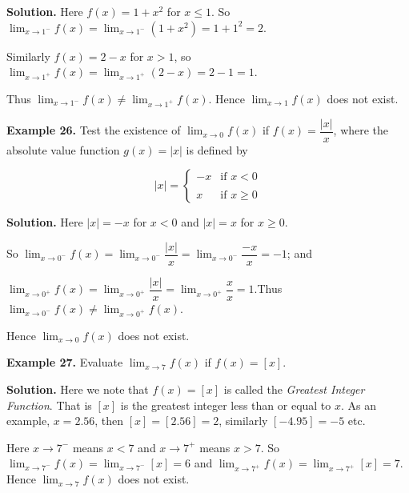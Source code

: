 \documentclass[../../main.tex]{subfiles}
\begin{document}
\textbf{Solution.} Here $f(x) = 1+x^2$ for $x\leq 1$. So $\lim_{x\rightarrow 1^-}f(x) = \lim_{x\rightarrow 1^-}(1+x^2) = 1+1^2 = 2$.

Similarly $f(x) = 2-x$ for $x>1$, so $\lim_{x\rightarrow 1^+}f(x) = \lim_{x\rightarrow 1^+}{(2-x)} = 2-1 = 1$.

Thus $\lim_{x\rightarrow 1^-}f(x) \neq \lim_{x\rightarrow 1^+}f(x)$. Hence $\lim_{x\rightarrow 1}{f(x)}$ does not exist.

\vspace{0.2cm}
\textbf{Example 26.}
\vspace{0.2cm}
Test the existence of $\lim_{x\rightarrow 0}f(x)$ if $f(x)= \dfrac{|x|}{x}$, where the absolute value function $g(x) = |x|$ is defined by 

\begin{equation*}
|x| = 
\begin{cases}
    -x     & \text{if   }     x < 0 \\\\
    x    & \text{if   }   x\geq 0
\end{cases}    
\end{equation*}
 
\textbf{Solution.} Here $|x| = -x$ for $x<0$ and $|x| = x$ for $x\geq 0$.

So $\lim_{x\rightarrow 0^-}f(x) = \lim_{x\rightarrow 0^-}\dfrac{|x|}{x} = \lim_{x\rightarrow 0^-}\dfrac{-x}{x} = -1$;   and 

$\lim_{x\rightarrow 0^+}f(x) = \lim_{x\rightarrow 0^+}\dfrac{|x|}{x} = \lim_{x\rightarrow 0^+}\dfrac{x}{x} = 1$.Thus $\lim_{x\rightarrow 0^-}f(x) \neq \lim_{x\rightarrow 0^+}f(x)$. 

Hence $\lim_{x\rightarrow 0}f(x)$ does not exist.

\vspace{0.2cm}
\textbf{Example 27.} 
\vspace{0.2cm}
Evaluate $\lim_{x\rightarrow 7}f(x)$ if $f(x)= [x]$.

\textbf{Solution.} Here we note that $f(x)= [x]$ is called the \textit{Greatest Integer Function}. That is $[x]$ is the greatest integer less than or equal to $x$. As an example, $x=2.56$, then $[x]=[2.56] = 2$, similarly $[-4.95] = -5$ etc.

Here $x\rightarrow 7^-$ means $x < 7$ and $x\rightarrow 7^+$ means $x > 7$. So $\lim_{x\rightarrow 7^-}f(x)= \lim_{x\rightarrow 7^-}[x] = 6$ and $\lim_{x\rightarrow 7^+}f(x)= \lim_{x\rightarrow 7^+}[x] = 7$. Hence $\lim_{x\rightarrow 7}{f(x)}$ does not exist.
 
\end{document}

